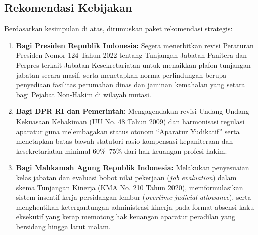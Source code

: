\documentclass[12pt, a4paper]{article}
\begin{document}
\begin{enumerate}
\end{enumerate}

\subsection{Rekomendasi Kebijakan}
Berdasarkan kesimpulan di atas, dirumuskan paket rekomendasi strategis:
\begin{enumerate}
    \item \textbf{Bagi Presiden Republik Indonesia:} Segera menerbitkan revisi Peraturan Presiden Nomor 124 Tahun 2022 tentang Tunjangan Jabatan Panitera dan Perpres terkait Jabatan Kesekretariatan untuk menaikkan plafon tunjangan jabatan secara masif, serta menetapkan norma perlindungan berupa penyediaan fasilitas perumahan dinas dan jaminan kemahalan yang setara bagi Pejabat Non-Hakim di wilayah mutasi.
    \item \textbf{Bagi DPR RI dan Pemerintah:} Mengagendakan revisi Undang-Undang Kekuasaan Kehakiman (UU No. 48 Tahun 2009) dan harmonisasi regulasi aparatur guna melembagakan status otonom ``Aparatur Yudikatif'' serta menetapkan batas bawah statutori rasio kompensasi kepaniteraan dan kesekretariatan minimal 60\%--75\% dari hak keuangan profesi hakim.
    \item \textbf{Bagi Mahkamah Agung Republik Indonesia:} Melakukan penyesuaian kelas jabatan dan evaluasi bobot nilai pekerjaan (\textit{job evaluation}) dalam skema Tunjangan Kinerja (KMA No. 210 Tahun 2020), memformulasikan sistem insentif kerja persidangan lembur (\textit{overtime judicial allowance}), serta menghentikan ketergantungan administrasi kinerja pada format absensi kaku eksekutif yang kerap memotong hak keuangan aparatur peradilan yang bersidang hingga larut malam.
\end{enumerate}
\end{document}
